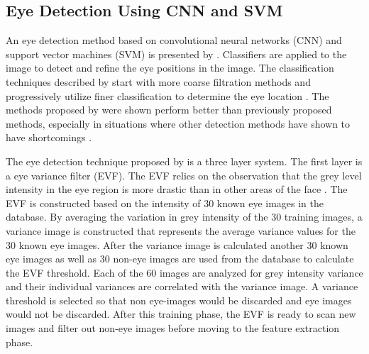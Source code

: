 \subsection{Eye Detection Using CNN and SVM}
An eye detection method based on convolutional neural networks (CNN) and support vector machines (SVM) is presented by \cite{yu2018eye}. Classifiers are applied to the image to detect and refine the eye positions in the image. The classification techniques described by \cite{yu2018eye} start with more coarse filtration methods and progressively utilize finer classification to determine the eye location \cite{yu2018eye}. The methods proposed by \cite{yu2018eye} were shown perform better than previously proposed methods, especially in situations where other detection methods have shown to have shortcomings \cite{yu2018eye}.

The eye detection technique proposed by \cite{yu2018eye} is a three layer system. The first layer is a eye variance filter (EVF). The EVF relies on the observation that the grey level intensity in the eye region is more drastic than in other areas of the face \cite{yu2018eye}. The EVF is constructed based on the intensity of 30 known eye images in the database. By averaging the variation in grey intensity of the 30 training images, a variance image is constructed that represents the average variance values for the 30 known eye images. After the variance image is calculated another 30 known eye images as well as 30 non-eye images are used from the database to calculate the EVF threshold. Each of the 60 images are analyzed for grey intensity variance and their individual variances are correlated with the variance image. A variance threshold is selected so that non eye-images would be discarded and eye images would not be discarded. After this training phase, the EVF is ready to scan new images and filter out non-eye images before moving to the feature extraction phase.

